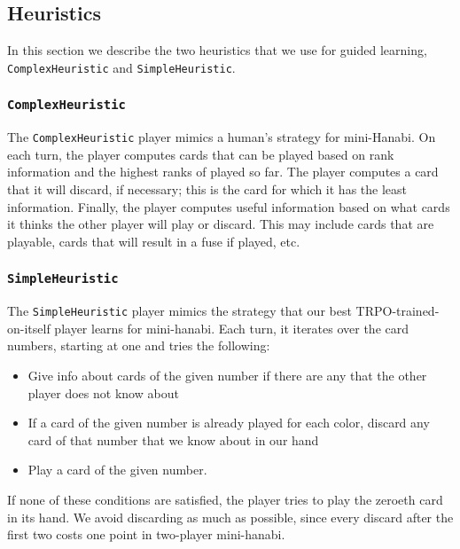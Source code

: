 \subsection{Heuristics}

In this section we describe the two heuristics that we use for guided learning,
\texttt{ComplexHeuristic} and \texttt{SimpleHeuristic}.

\subsubsection{\texttt{ComplexHeuristic}}

The \texttt{ComplexHeuristic} player mimics a human's strategy for mini-Hanabi. On each
turn, the player computes cards that can be played based on rank information
and the highest ranks of played so far. The player computes a card that it will
discard, if necessary; this is the card for which it has the least information.
Finally, the player computes useful information based on what cards it thinks
the other player will play or discard. This may include cards that are
playable, cards that will result in a fuse if played, etc.

\subsubsection{\texttt{SimpleHeuristic}}


The \texttt{SimpleHeuristic} player mimics the strategy that our best
TRPO-trained-on-itself player learns for mini-hanabi.  Each turn, it iterates
over the card numbers, starting at one and tries the following:

\begin{itemize}[leftmargin=*]
\item Give info about cards of the given number if there are any that the other player does not know about
\item If a card of the given number is already played for each color, discard any card of that number that we know about in our hand
\item Play a card of the given number.
\end{itemize}

If none of these conditions are satisfied, the player tries to play the zeroeth card in
its hand. We avoid discarding as much as possible, since every discard after
the first two costs one point in two-player mini-hanabi.

